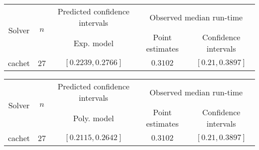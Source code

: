 \begin{tabular}{ccccc}
\hline 
\multirow{2}{*}{Solver} & \multirow{2}{*}{$n$} & Predicted confidence intervals & \multicolumn{2}{c}{Observed median  run-time}\tabularnewline
 &  & Exp. model  & Point estimates  & Confidence intervals\tabularnewline
\hline 
\hline 
\multirow{0}{*}{cachet} & 27 & $\mathbf{\left[0.2239,0.2766\right]}$ & $0.3102$ & $\left[0.21,0.3897\right]$ \tabularnewline 
\hline 
\end{tabular} 

\begin{tabular}{ccccc}
\hline 
\multirow{2}{*}{Solver} & \multirow{2}{*}{$n$} & Predicted confidence intervals & \multicolumn{2}{c}{Observed median  run-time}\tabularnewline
 &  & Poly. model  & Point estimates  & Confidence intervals\tabularnewline
\hline 
\hline 
\multirow{0}{*}{cachet} & 27 & $\mathbf{\left[0.2115,0.2642\right]}$ & $0.3102$ & $\left[0.21,0.3897\right]$ \tabularnewline 
\hline 
\end{tabular} 


